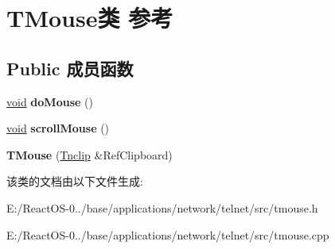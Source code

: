 \hypertarget{class_t_mouse}{}\section{T\+Mouse类 参考}
\label{class_t_mouse}
\subsection*{Public 成员函数}
\begin{DoxyCompactItemize}
\item 
\mbox{\label{class_t_mouse_a6a7751ce07cef1736b07763e691e61c1}} 
\hyperlink{interfacevoid}{void} {\bfseries do\+Mouse} ()
\item 
\mbox{\label{class_t_mouse_a07c88a6b3d030b63d3521bdf3a5bc395}} 
\hyperlink{interfacevoid}{void} {\bfseries scroll\+Mouse} ()
\item 
\mbox{\label{class_t_mouse_a77f480a369d4c1ebca70cd10d94c01d2}} 
{\bfseries T\+Mouse} (\hyperlink{class_tnclip}{Tnclip} \&Ref\+Clipboard)
\end{DoxyCompactItemize}


该类的文档由以下文件生成\+:\begin{DoxyCompactItemize}
\item 
E\+:/\+React\+O\+S-\/0../base/applications/network/telnet/src/tmouse.\+h\item 
E\+:/\+React\+O\+S-\/0../base/applications/network/telnet/src/tmouse.\+cpp\end{DoxyCompactItemize}

